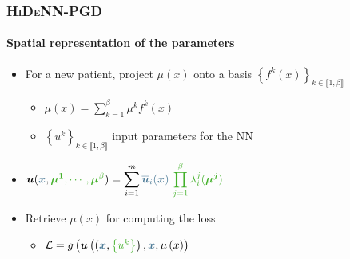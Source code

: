 \documentclass[aspectratio=1610]{beamer}
\begin{document}
	
	
	\begin{frame}
		\frametitle{\textsc{HiDeNN-PGD}}
		\framesubtitle{Spatial representation of the parameters}
		\begin{minipage}{0.58\linewidth}
			
			\begin{itemize}
				\item For a new patient, project $\mu\left(x\right)$ onto a basis $\left\{f^k\left(x\right)\right\}_{k \in \llbracket 1, \beta \rrbracket}$
				\begin{itemize}
					\item $\mu\left(x\right) = \sum\limits_{k=1}^{\beta}\mu^{k}f^k\left(x\right)$
					\item $\left\{u^k\right\}_{k \in \llbracket 1, \beta \rrbracket}$ input parameters for the NN
				\end{itemize}
				\item \small{$\displaystyle\vect{u}(\textcolor{BleuLMS!70}{\vect{x}},\textcolor{LGreenLMS}{\vect{\mu^1}, \cdots, \vect{\mu}^{\beta}}) = \sum\limits_{i=1}^m \textcolor{BleuLMS!70}{\overline{\vect{u}}_i(\vect{x})} ~\textcolor{LGreenLMS}{\prod_{j=1}^{\beta}\lambda_i^j(\vect{\mu^j})}$} 
				\item Retrieve $\mu\left(x\right)$ for computing the loss 
				\begin{itemize}
					\item $\mathcal{L} = g\left(\vect{u}\left((\textcolor{BleuLMS!70}{\vect{x}},\textcolor{LGreenLMS}{\left\{u^k\right\}}\right),\textcolor{BleuLMS!70}{\vect{x}},\mu\left(x\right)\right) $
				\end{itemize}
			\end{itemize}
			
		\end{minipage}
		\hfill 
		\begin{minipage}{0.38\linewidth}
			\centering
			

\end{minipage}
\end{frame}
\end{document}
